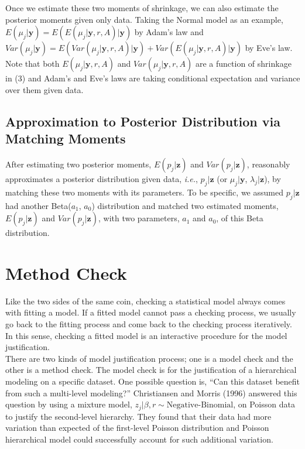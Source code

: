 \documentclass[article]{jss}
\begin{document}
Once we estimate these two moments of shrinkage, we can also estimate the posterior moments given only data. Taking the Normal model as an example,  $E(\mu_{j}\vert \textbf{y})=E(E(\mu_{j}\vert \textbf{y}, r, A)\vert \textbf{y})$ by Adam's law and $Var(\mu_{j}\vert \textbf{y})=E(Var(\mu_{j}\vert \textbf{y}, r, A)\vert \textbf{y})+Var(E(\mu_{j}\vert \textbf{y}, r, A)\vert \textbf{y})$ by Eve's law. Note that both $E(\mu_{j}\vert \textbf{y}, r, A)$ and $Var(\mu_{j}\vert \textbf{y}, r, A)$ are a function of shrinkage in (3) and Adam's and Eve's laws are taking conditional expectation and variance over them given data.

\subsection[Approximation to Posterior Distribution by Moment Matching]{Approximation to Posterior Distribution via Matching Moments}
After estimating two posterior moments, $E(p_{j}\vert \textbf{z})$ and $Var(p_{j}\vert \textbf{z})$,  reasonably approximates a posterior distribution given data, \emph{i.e.}, $p_{j}\vert \textbf{z}$ (or $\mu_{j}\vert \textbf{y}$, $\lambda_{j}\vert \textbf{z}$), by matching these two moments with its parameters. To be specific, we assumed $p_{j}\vert \textbf{z}$ had another Beta($a_{1}$, $a_{0}$) distribution and matched two estimated moments, $E(p_{j}\vert \textbf{z})$ and $Var(p_{j}\vert \textbf{z})$, with two parameters, $a_{1}$ and $a_{0}$, of this Beta distribution. 

\section[Method Check]{Method Check}
Like the two sides of the same coin, checking a statistical model always comes with fitting a model. If a fitted model cannot pass a checking process, we usually go back to the fitting process and come back to the checking process iteratively. In this sense, checking a fitted model is an interactive procedure for the model justification.
\\

There are two kinds of model justification process; one is a model check and the other is a method check. The model check is for the justification of a hierarchical modeling on a specific dataset. One possible question is, ``Can this dataset benefit from such a multi-level modeling?'' Christiansen and Morris (1996) answered this question by using a mixture model, $z_{j}\vert \beta, r\sim\textrm{Negative-Binomial}$, on Poisson data to justify the second-level hierarchy. They found that their data had more variation than expected of the first-level Poisson distribution and Poisson hierarchical model could successfully account for such additional variation.
\\
\end{document}
